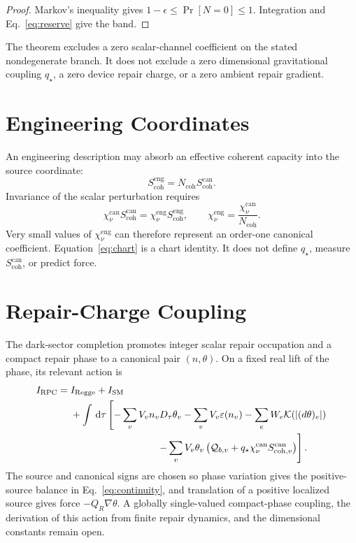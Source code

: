 \documentclass[11pt]{article}
\numberwithin{equation}{section}
\theoremstyle{remark}
\newcommand{\RPC}{\mathrm{RPC}}
\newcommand{\chican}{\chi_\nu^{\mathrm{can}}}
\newcommand{\chieng}{\chi_\nu^{\mathrm{eng}}}
\newcommand{\scohcan}{S_{\mathrm{coh}}^{\mathrm{can}}}
\newcommand{\scoheng}{S_{\mathrm{coh}}^{\mathrm{eng}}}
\newcommand{\Ncoh}{N_{\mathrm{coh}}}
\newcommand{\dd}{\,\mathrm d}
\begin{document}
\begin{proof}
Markov's inequality gives
\(1-\epsilon\le\Pr[N=0]\le1\). Integration and
Eq.~\eqref{eq:reserve} give the band.
\end{proof}

The theorem excludes a zero scalar-channel coefficient on the stated
nondegenerate branch. It does not exclude a zero dimensional gravitational
coupling \(q_\star\), a zero device repair charge, or a zero ambient repair
gradient.

\section{Engineering Coordinates}

An engineering description may absorb an effective coherent capacity into
the source coordinate:
\begin{equation}
\scoheng=\Ncoh\scohcan.
\end{equation}
Invariance of the scalar perturbation requires
\begin{equation}
\chican\scohcan=\chieng\scoheng,
\qquad
\boxed{\chieng=\frac{\chican}{\Ncoh}}.
\label{eq:chart}
\end{equation}
Very small values of \(\chieng\) can therefore represent an order-one
canonical coefficient. Equation~\eqref{eq:chart} is a chart identity. It does
not define \(q_\star\), measure \(\scohcan\), or predict force.

\section{Repair-Charge Coupling}

The dark-sector completion promotes integer scalar repair occupation and a
compact repair phase to a canonical pair \((n,\theta)\). On a fixed real lift
of the phase, its relevant action is
\begin{align}
I_{\RPC}={}&I_{\rm Regge}+I_{\rm SM}
\nonumber\\
&+\int\dd\tau\left[
-\sum_vV_vn_vD_\tau\theta_v
-\sum_vV_v\varepsilon(n_v)
-\sum_eW_e\mathcal K(|(d\theta)_e|)
\right.\nonumber\\
&\hspace{31mm}\left.
-\sum_vV_v\theta_v
\left(\mathcal Q_{b,v}
+q_\star\chican S_{{\rm coh},v}^{\rm can}\right)
\right].
\label{eq:rpc-action}
\end{align}
The source and canonical signs are chosen so phase variation gives the
positive-source balance in Eq.~\eqref{eq:continuity}, and translation of a
positive localized source gives force \(-Q_R\nabla\theta\). A globally
single-valued compact-phase coupling, the derivation of this action from finite
repair dynamics, and the dimensional constants remain open.
\end{document}
